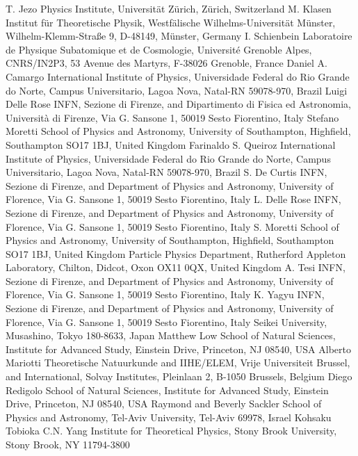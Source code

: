 T. Jezo {Physics Institute, Universit\"at Z\"urich, Z\"urich, Switzerland}
M. Klasen {Institut f\"ur Theoretische Physik, Westf\"alische Wilhelms-Universit\"at M\"unster, Wilhelm-Klemm-Stra\ss e 9, D-48149, M\"unster, Germany}
I. Schienbein {Laboratoire de Physique Subatomique et de Cosmologie, Universit\'e Grenoble Alpes, CNRS/IN2P3, 53 Avenue des Martyrs, F-38026 Grenoble, France}
Daniel A. Camargo {International Institute of Physics, Universidade Federal do Rio Grande do Norte, Campus Universitario, Lagoa Nova, Natal-RN 59078-970, Brazil}
Luigi Delle Rose {INFN, Sezione di Firenze, and Dipartimento di Fisica ed Astronomia, Universit\`a di Firenze,  Via G. Sansone 1, 50019 Sesto Fiorentino, Italy}
Stefano Moretti {School of Physics and Astronomy, University of Southampton, Highfield, Southampton SO17 1BJ, United Kingdom}
Farinaldo S. Queiroz {International Institute of Physics, Universidade Federal do Rio Grande do Norte, Campus Universitario, Lagoa Nova, Natal-RN 59078-970, Brazil}
S. De Curtis {INFN, Sezione di Firenze, and Department of Physics and Astronomy, University of Florence, Via G. Sansone 1, 50019 Sesto Fiorentino, Italy}
L. Delle Rose {INFN, Sezione di Firenze, and Department of Physics and Astronomy, University of Florence, Via G. Sansone 1, 50019 Sesto Fiorentino, Italy}
S. Moretti {School of Physics and Astronomy, University of Southampton, Highfield, Southampton SO17 1BJ, United Kingdom} {Particle Physics Department, Rutherford Appleton Laboratory, Chilton, Didcot, Oxon OX11 0QX, United Kingdom}
A. Tesi {INFN, Sezione di Firenze, and Department of Physics and Astronomy, University of Florence, Via G. Sansone 1, 50019 Sesto Fiorentino, Italy}
K. Yagyu {INFN, Sezione di Firenze, and Department of Physics and Astronomy, University of Florence, Via G. Sansone 1, 50019 Sesto Fiorentino, Italy} {Seikei University, Musashino, Tokyo 180-8633, Japan}
Matthew Low {School of Natural Sciences, Institute for Advanced Study, Einstein Drive, Princeton, NJ 08540, USA}
Alberto Mariotti {Theoretische Natuurkunde and IIHE/ELEM, Vrije Universiteit Brussel, and International, Solvay Institutes, Pleinlaan 2, B-1050 Brussels, Belgium}
Diego Redigolo {School of Natural Sciences, Institute for Advanced Study, Einstein Drive, Princeton, NJ 08540, USA} {Raymond and Beverly Sackler School of Physics and Astronomy, Tel-Aviv University, Tel-Aviv 69978, Israel}
Kohsaku Tobioka {C.N. Yang Institute for Theoretical Physics, Stony Brook University, Stony Brook, NY 11794-3800}
